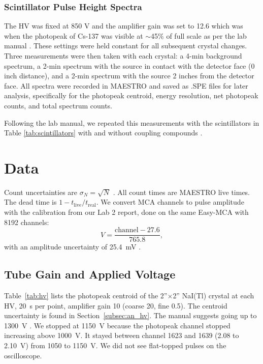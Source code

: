\documentclass[12pt]{article}
\begin{document}
\subsubsection{Scintillator Pulse Height Spectra}
\label{subsubsec:pulse_height_spectra}

The HV was fixed at 850 V and the amplifier gain was set to 12.6 which was when the photopeak of Cs-137 was visible at $\sim$45\% of full scale as per the lab manual \cite{labmanual}. These settings were held constant for all subsequent crystal changes. Three measurements were then taken with each crystal: a 4-min background spectrum, a 2-min spectrum with the source in contact with the detector face (0 inch distance), and a 2-min spectrum with the source 2 inches from the detector face. All spectra were recorded in MAESTRO and saved as .SPE files for later analysis, specifically for the photopeak centroid, energy resolution, net photopeak counts, and total spectrum counts.

Following the lab manual, we repeated this measurements with the scintillators in Table \ref{tab:scintillators} with and without coupling compounds \cite{labmanual}.

\section{Data}
\label{sec:data}

Count uncertainties are $\sigma_N = \sqrt{N}$ \cite{knoll}. All count times are MAESTRO live times. The dead time is $1 - t_{\text{live}}/t_{\text{real}}$. We convert MCA channels to pulse amplitude with the calibration from our Lab 2 report, done on the same Easy-MCA with 8192 channels:
\begin{equation}
V = \frac{\text{channel} - 27.6}{765.8},
\label{eq:mcacal}
\end{equation}
with an amplitude uncertainty of 25.4~mV \cite{lab2}.

\subsection{Tube Gain and Applied Voltage}

Table~\ref{tab:hv} lists the photopeak centroid of the 2''$\times$2'' NaI(Tl) crystal at each HV, 20~s per point, amplifier gain 10 (coarse 20, fine 0.5). The centroid uncertainty is found in Section~\ref{subsec:an_hv}. The manual suggests going up to 1300~V \cite{labmanual}. We stopped at 1150~V because the photopeak channel stopped increasing above 1000~V. It stayed between channel 1623 and 1639 (2.08 to 2.10~V) from 1050 to 1150~V. We did not see flat-topped pulses on the oscilloscope.
\end{document}
